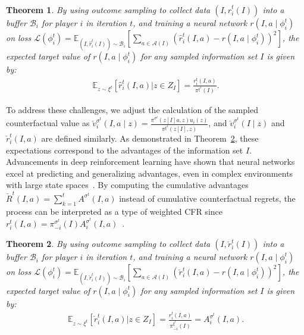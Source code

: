 \documentclass[letterpaper]{article} %
\makeatletter
\newtheorem{theorem}{Theorem}
\renewenvironment{align*}{%
  \linenomath 
  \start@align\@ne\st@rredtrue\m@ne
}{%
  \endalign
  \endlinenomath 
}
\makeatother
\begin{document}
\begin{theorem}
By using outcome sampling to collect data $(I, \hat{r}_i^t(I))$ into a buffer $\mathcal{B}_i$ for player $i$ in iteration $t$, and training a neural network $r(I, a \mid \phi^t_i)$ on loss $\mathcal{L}(\phi_i^t)=\mathbb{E}_{(I, \hat{r}_i^t(I))\sim \mathcal{B}_i}\left[\sum_{a\in \mathcal{A}(I)}^{}\left(\hat{r}_i^t(I, a)- r(I, a \mid \phi_i^t)\right)^2 \right] $, the expected target value of $r(I, a \mid \phi_i^t)$ for any sampled information set $I$ is given by:
\begin{align*}
    \mathbb{E}_{z \sim \xi^t}\left[ \hat{r}_i^{t}(I, a) \vert z \in Z_I\right] =  \frac{r_i^t(I, a)}{\pi^{\xi^t}(I)}.
\end{align*}
\label{thm:1}
\end{theorem}

To address these challenges, we adjust the calculation of the sampled counterfactual value as
    $\check{v}_i^{\sigma^t}(I, a \mid z) = \frac{\pi^{\sigma^t}(z[I]a, z)u_i(z)}{\pi^{\xi^t}(z[I], z)}$,
and $\check{v}_i^{\sigma^t}(I\mid z)$ and $\check{r}_i^t(I, a)$ are defined similarly.
As demonstrated in Theorem~\ref{thm:2}, these expectations correspond to the advantages of the information set $I$.
Advancements in deep reinforcement learning have shown that neural networks excel at predicting and generalizing advantages, even in complex environments with large state spaces~\cite{schulman2017proximal}.
By computing the cumulative advantages $\check{R}^t(I, a)=\sum_{k=1}^{t}A^{\sigma^t}(I, a)$ instead of cumulative counterfactual regrets, the process can be interpreted as a type of weighted CFR since $r_i^t(I, a)=\pi_{-i}^{\sigma^t}(I)A_i^{\sigma^t}(I, a) $~\cite{srinivasan2018actor}.
\begin{theorem}
By using outcome sampling to collect data $(I, \check{r}_i^t(I))$ into a buffer $\mathcal{B}_i$ for player $i$ in iteration $t$, and training a neural network $r(I, a \mid \phi_i^t)$ on loss $\mathcal{L}(\phi_i^t)=\mathbb{E}_{(I, \check{r}_i^t(I))\sim \mathcal{B}_i}\left[\sum_{a\in \mathcal{A}(I)}^{}\left(\check{r}_i^t(I, a) - r(I, a \mid \phi_i^t)\right)^2\right] $, the expected target value of $r(I, a \mid \phi_i^t)$ for any sampled information set $I$ is given by:
\begin{align*}
    \mathbb{E}_{z \sim \xi^t}\left[ \check{r}_i^{t}(I, a) \vert z \in Z_I\right] =  \frac{r_i^t(I, a)}{\pi_{-i}^{\xi^t}(I) } =A_i^{\sigma^t}(I, a).
\end{align*}
\label{thm:2}
\end{theorem}
\end{document}
